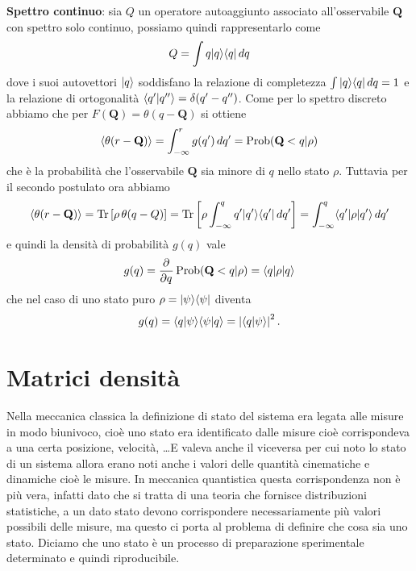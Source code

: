 \textbf{Spettro continuo}: sia $ Q $ un operatore autoaggiunto associato all'osservabile $ \mathbf{Q} $ con spettro solo continuo, possiamo quindi 
rappresentarlo come 
\begin{align*}
  Q = \int q \vert q \rangle \langle q \vert \,dq
\end{align*}
dove i suoi autovettori $ \vert q \rangle $ soddisfano la relazione di completezza $ \int \vert q \rangle \langle q \vert \,dq = 1 $ e la relazione di ortogonalità 
$ \langle q'|q'' \rangle = \delta(q' - q'') $. Come per lo spettro discreto abbiamo che per $ F(\mathbf{Q}) = \theta(q - \mathbf{Q}) $ si ottiene 
\begin{align*}
  \left< \theta(r - \mathbf{Q}) \right> = \int_{-\infty}^{r} g(q') \,dq' = \operatorname{\textnormal{Prob}} (\mathbf{Q} < q \vert \rho)
\end{align*}
che è la probabilità che l'osservabile $ \mathbf{Q} $ sia minore di $ q $ nello stato $ \rho $. Tuttavia per il secondo postulato ora abbiamo 
\begin{align*}
  \left< \theta(r - \mathbf{Q}) \right> = \operatorname{\textnormal{Tr}} \left[ \rho \, \theta(q - Q) \right] = \operatorname{\textnormal{Tr}}\left[ \rho \int_{-\infty}^{q} q'\vert q' \rangle \langle q' \vert \,dq' \right]
  = \int_{-\infty}^{q} \langle q' \vert\rho \vert q' \rangle\,dq'
\end{align*}
e quindi la densità di probabilità $ g(q) $ vale 
\begin{align*}
  g(q) = \frac{\partial^{} {}}{\partial {q}^{}} \operatorname{\textnormal{Prob}}(\mathbf{Q} < q | \rho) = \langle q \vert \rho \vert q \rangle
\end{align*}
che nel caso di uno stato puro $ \rho = \vert \psi \rangle \langle \psi \vert $ diventa
\begin{align*}
  g(q) = \langle q | \psi \rangle \langle \psi | q \rangle = \left|{\langle q | \psi \rangle}\right|^2.
\end{align*}

\section{Matrici densità}

Nella meccanica classica la definizione di stato del sistema era legata alle misure in modo biunivoco, cioè uno stato era identificato dalle misure 
cioè corrispondeva a una certa posizione, velocità, \dots E valeva anche il viceversa per cui noto lo stato di un sistema allora erano noti anche i 
valori delle quantità cinematiche e dinamiche cioè le misure. In meccanica quantistica questa corrispondenza non è più vera, infatti dato che si 
tratta di una teoria che fornisce distribuzioni statistiche, a un dato stato devono corrispondere necessariamente più valori possibili delle misure,
ma questo ci porta al problema di definire che cosa sia uno stato. Diciamo che uno stato è un processo di preparazione sperimentale determinato e quindi 
riproducibile. 

